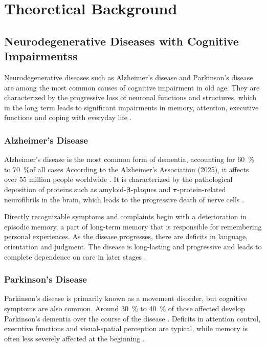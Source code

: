 \chapter[Theoretical Background]{Theoretical Background}

\section{Neurodegenerative Diseases with Cognitive Impairmentss}
Neurodegenerative diseases such as Alzheimer's disease and Parkinson's disease are among the most common causes of cognitive impairment in old age. They are characterized by the progressive loss of neuronal functions and structures, which in the long term leads to significant impairments in memory, attention, executive functions and coping with everyday life \cite{Harvey.2019}.

\subsection{Alzheimer's Disease}
Alzheimer’s disease is the most common form of dementia, accounting for \SI{60}{\%} to \SI{70}{\%}of all cases \cite{WorldHealthOrganization.2021} According to the Alzheimer's Association (2025), it affects over 55 million people worldwide \cite{Association.2025}. It is characterized by the pathological deposition of proteins such as amyloid-$\boldsymbol{\beta}$-plaques and $\boldsymbol{\tau}$-protein-related neurofibrils in the brain, which leads to the progressive death of nerve cells \cite{Dubois.2016}.

Directly recognizable symptoms and complaints begin with a deterioration in episodic memory, a part of long-term memory that is responsible for remembering personal experiences. As the disease progresses, there are deficits in language, orientation and judgment. The disease is long-lasting and progressive and leads to complete dependence on care in later stages \cite{WorldHealthOrganization.2021}.

\subsection{Parkinson's Disease}
Parkinson's disease is primarily known as a movement disorder, but cognitive symptoms are also common. Around \SI{30}{\%} to \SI{40}{\%} of those affected develop Parkinson's dementia over the course of the disease \cite{Janvin.2005}. Deficits in attention control, executive functions and visual-spatial perception are typical, while memory is often less severely affected at the beginning \cite{Emre.2007}.

